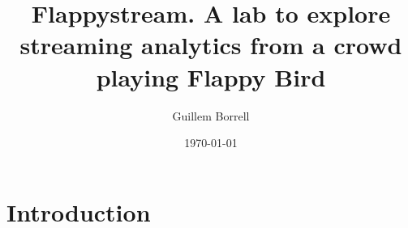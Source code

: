 \documentclass{article}
\begin{document}
\author{Guillem Borrell}
\title{Flappystream. A lab to explore streaming analytics from a crowd playing Flappy Bird}
\date{\today{}}
\maketitle{}
\tableofcontents{}

\section{Introduction}
\end{document}
